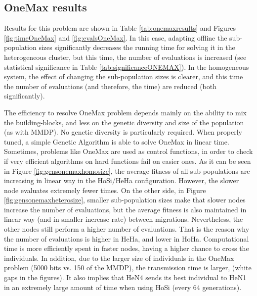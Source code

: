 \subsection{OneMax results}

Results  %
for this problem are shown in Table \ref{tab:onemaxresults} and Figures  \ref{fig:timeOneMax} and \ref{fig:evalsOneMax}. In this case, adapting offline the sub-population sizes significantly decreases  the running time for solving it in the heterogeneous cluster, but this time, the number of evaluations is increased (see statistical significance in Table \ref{tab:significanceONEMAX}). In the homogeneous system, the effect of changing the sub-population sizes is clearer, and this time the number of evaluations (and therefore, the time) are reduced (both significantly). 

The efficiency to resolve OneMax problem depends mainly on the ability to mix
the building-blocks, and less on the genetic diversity and size of the
population (as with MMDP). No genetic diversity is particularly
required. When properly tuned, a simple Genetic Algorithm is able to
solve OneMax in linear time. Sometimes, problems like OneMax are used
as control functions, in order to check if very efficient algorithms
on hard functions fail on easier ones. As it can be seen in Figure
\ref{fig:gensonemaxhomosize}, the average fitness of all sub-populations
are increasing in linear way in the HoSi/HeHa configuration. However,
the slower node evaluates extremely fewer times.  On the other
side, in Figure \ref{fig:gensonemaxheterosize}, smaller sub-population
sizes make that slower nodes increase the number of evaluations, %
but the average fitness is also maintained in linear way (and in
smaller increase rate) between migrations. Nevertheless, the other
nodes still perform a higher number of evaluations. That is the
reason why the number of evaluations is higher in HeHa, and lower in
HoHa. Computational time is more efficiently spent in faster nodes,
having a higher chance to cross the individuals. %
 In addition, due to
the larger size of  individuals in the OneMax problem (5000 bits
vs. 150 of the MMDP), the transmission time is larger, (white gaps in the
figures). %
It also implies that HeN4 sends its best individual to
HeN1 in an extremely large amount of time when using HoSi (every 64
generations). 


